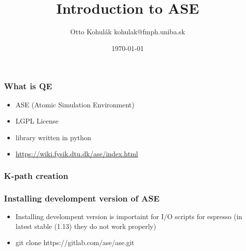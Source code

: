 \documentclass{beamer}
\begin{document}
\title{Introduction to ASE}   
\author{Otto Kohul\'{a}k \newline kohulak@fmph.uniba.sk} 
\date{\today} 

\frame{\titlepage} 

\begin{frame}
  \frametitle{What is QE}
  \begin{itemize}
    \item ASE (Atomic Simulation Environment)
    \item LGPL License
    \item library written in python
    \item \url{https://wiki.fysik.dtu.dk/ase/index.html}
  \end{itemize}
\end{frame}

\begin{frame}
  \frametitle{K-path creation}
  
\end{frame}

\begin{frame}
  \frametitle{Installing develompent version of ASE}
  \begin{itemize}
    \item Installing develompent version is importaint for I/O scripts for espresso (in latest stable (1.13) they do not work properly)
    \item git clone https://gitlab.com/ase/ase.git
  \end{itemize}
\end{frame}
\end{document}
